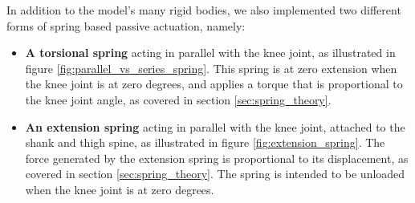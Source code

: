 In addition to the model's many rigid bodies, we also implemented two different forms of spring based passive actuation, namely: 
\begin{itemize}
\item \textbf{A torsional spring} acting in parallel with the knee joint, as illustrated in figure \ref{fig:parallel_vs_series_spring}. This spring is at zero extension when the knee joint is at zero degrees, and applies a torque that is proportional to the knee joint angle, as covered in section \ref{sec:spring_theory}.
\item \textbf{An extension spring} acting in parallel with the knee joint, attached to the shank and thigh spine, as illustrated in figure \ref{fig:extension_spring}. The force generated by the extension spring is proportional to its displacement, as covered in section \ref{sec:spring_theory}. The spring is intended to be unloaded when the knee joint is at zero degrees.
\end{itemize}


